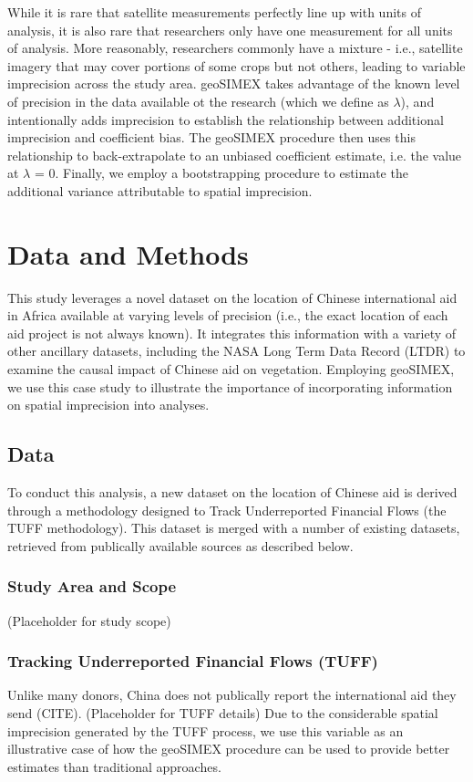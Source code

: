 \documentclass[11pt]{article}
\begin{document}
\par
While it is rare that satellite measurements perfectly line up with units of analysis, it is also rare that researchers only have one measurement for all units of analysis.
More reasonably, researchers commonly have a mixture - i.e., satellite imagery that may cover portions of some crops but not others, leading to variable imprecision across the study area.
geoSIMEX takes advantage of the known level of precision in the data available ot the research (which we define as $\lambda$), and intentionally adds imprecision to establish the relationship between additional imprecision and coefficient bias.
The geoSIMEX procedure then uses this relationship to back-extrapolate to an unbiased coefficient estimate, i.e. the value at $\lambda$ = 0.
Finally, we employ a bootstrapping procedure to estimate the additional variance attributable to spatial imprecision.





\newpage

\section{Data and Methods}
This study leverages a novel dataset on the location of Chinese international aid in Africa available at varying levels of precision (i.e., the exact location of each aid project is not always known).  
It integrates this information with a variety of other ancillary datasets, including the NASA Long Term Data Record (LTDR) to examine the causal impact of Chinese aid on vegetation.  
Employing geoSIMEX, we use this case study to illustrate the importance of incorporating information on spatial imprecision into analyses.
\subsection{Data}
To conduct this analysis, a new dataset on the location of Chinese aid is derived through a methodology designed to Track Underreported Financial Flows (the TUFF methodology).  
This dataset is merged with a number of existing datasets, retrieved from publically available sources as described below.
\subsubsection{Study Area and Scope}
(Placeholder for study scope)
\subsubsection{Tracking Underreported Financial Flows (TUFF)}
Unlike many donors, China does not publically report the international aid they send (CITE).
(Placeholder for TUFF details)
Due to the considerable spatial imprecision generated by the TUFF process, we use this variable as an illustrative case of how the geoSIMEX procedure can be used to provide better estimates than traditional approaches.
\end{document}
